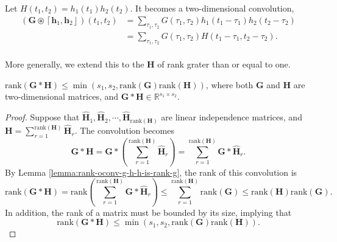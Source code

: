 \documentclass[twoside,11pt]{article}
\def\oconv{\circledast}
\def\rank{\text{rank}}
\def\tvar#1{\mathbf{#1}} %
\def\tvarhat#1{\widehat{\mathbf{#1}}} %
\def\lcerfl#1{\left\lceil{#1}\right\rfloor}
\begin{document}
Let \(H(t_1, t_2) = h_1(t_1) h_2(t_2)\). It becomes a two-dimensional convolution,
\begin{equation*}
  \begin{aligned}
    \left(\tvar{G} \oconv \lcerfl{\tvar{h}_1, \tvar{h}_2}\right)(t_1, t_2)
     & = \sum_{\tau_1, \tau_2} G(\tau_1, \tau_2) h_1(t_1 - \tau_1) h_2(t_2 - \tau_2) \\
     & = \sum_{\tau_1, \tau_2} G(\tau_1, \tau_2) H(t_1 - \tau_1, t_2 - \tau_2).      \\
  \end{aligned}
\end{equation*}

  More generally, we extend this to the \(\tvar{H}\) of rank grater than or equal to one.


\begin{lemma}
  \(\rank(\tvar{G} * \tvar{H}) \le \min\left(s_1, s_2, \rank(\tvar{G}) \rank(\tvar{H}) \right)\), where both \(\tvar{G}\) and \(\tvar{H}\) are two-dimensional matrices, and \(\tvar{G} * \tvar{H} \in \mathbb{R}^{s_1 \times s_2}\).
  \label{lemma:2d-conv-g-h-is-mul-rank-g-rank-h}
\end{lemma}

\begin{proof}
  
  Suppose that \(\tvarhat{H}_1, \tvarhat{H}_2, \cdots, \tvarhat{H}_{\rank(\tvar{H})}\) are linear independence matrices, and \(\tvar{H} = \sum_{r=1}^{\rank(\tvar{H})} \tvarhat{H}_r\). The convolution becomes
  \begin{equation*}
    \tvar{G} * \tvar{H}
    = \tvar{G} * \left(\sum_{r=1}^{\rank(\tvar{H})} \tvarhat{H}_r \right)
    = \sum_{r=1}^{\rank(\tvar{H})} \tvar{G} * \tvarhat{H}_r.
  \end{equation*}
  By Lemma \ref{lemma:rank-oconv-g-h-h-is-rank-g}, the rank of this convolution is
  \begin{equation*}
    \rank\left(\tvar{G} * \tvar{H}\right)
    = \rank\left(\sum_{r=1}^{\rank(\tvar{H})} \tvar{G} * \tvarhat{H}_r\right)
    \le \sum_{r=1}^{\rank(\tvar{H})} \rank(\tvar{G})
    \le \rank(\tvar{H}) \rank(\tvar{G}).
  \end{equation*}
  In addition, the rank of a matrix must be bounded by its size, implying that
  \begin{equation*}
    \rank(\tvar{G} * \tvar{H}) \le \min(s_1, s_2, \rank(\tvar{G}) \rank(\tvar{H})).
  \end{equation*}
  
\end{proof}
\end{document}
